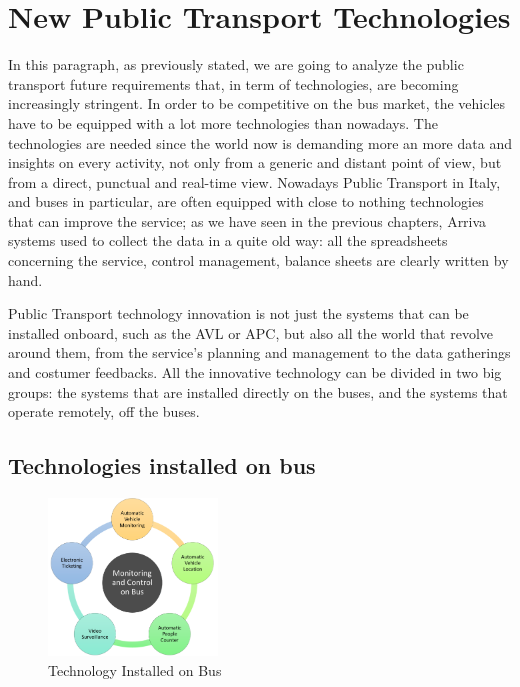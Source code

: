 \newpage
\section{New Public Transport Technologies}
\label{sec:newtech}
In this paragraph, as previously stated, we are going to analyze the public transport future requirements that, in term of technologies, are becoming increasingly stringent. In order to be competitive on the bus market, the vehicles have to be equipped with a lot more technologies than nowadays. The technologies are needed since the world now is demanding more an more data and insights on every activity, not only from a generic and distant point of view, but from a direct, punctual and real-time view. Nowadays Public Transport in Italy, and buses in particular, are often equipped with close to nothing technologies that can improve the service; as we have seen in the previous chapters, Arriva systems used to collect the data in a quite old way: all the spreadsheets concerning the service, control management, balance sheets are clearly written by hand.

Public Transport technology innovation is not just the systems that can be installed onboard, such as the AVL or APC, but also all the world that revolve around them, from the service’s planning and management to the data gatherings and costumer feedbacks. All the innovative technology can be divided in two big groups: the systems that are installed directly on the buses, and the systems that operate remotely, off the buses.


\subsection{Technologies installed on bus}
\label{subsec:techonbus}

\begin{figure}[h!]
    \centering
    \includegraphics[width=0.4\textwidth]{Images/New Technologies/immagine intro Tech On.png}
    \caption{Technology Installed on Bus}
    \label{fig:onbus}
\end{figure}


